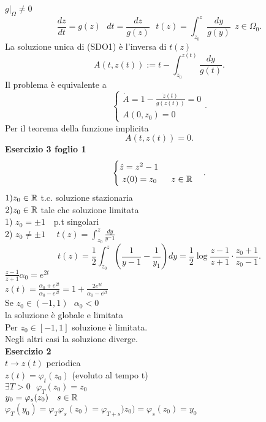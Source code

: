 \documentclass[12px]{article}
\begin{document}
  $g|_\Omega\neq 0$\\
   \[
	   \frac{dz}{dt} = g(z) \ \ \ dt= \frac {dz}{g(z)} \ \ \ t(z) = \int_{z_0}^z \frac{dy}{g(y)} \ \ z\in\Omega_0
  .\] 
  La soluzione unica di (SDO1) è l'inversa di $t(z)$\\
   \[
	   A(t,z(t)) := t - \int_{z_0}^{z(t)}\frac{dy}{g(t)}
  .\] 
  Il problema è equivalente a 
   \[
  \begin{cases}
	  \dot A = 1 - \frac{\dot z(t)}{g(z(t))} =0 \\
	  A(0,z_0) = 0
  \end{cases}
  .\] 
  Per il teorema della funzione implicita\\
  \[
  A(t,z(t)) = 0
  .\] 
  \textbf{Esercizio 3 foglio 1}\\
  \[
  \begin{cases}
  	\dot z = z^2 - 1\\\
	z(0) = z_0 \ \ \ \ \ z\in\mathbb{R}
  \end{cases}
  .\] 
  $1) z_0\in\mathbb{R}$ t.c. soluzione stazionaria\\
  $2) z_0\in \mathbb{R} $ tale che soluzione limitata
	\hline \ \\
	1) $z_0 = \pm 1\ \  \ $ p.t singolari\\
	2) $z_0 \neq \pm 1$ \ \ $t(z) = \int_{z_0}^z \frac {dy}{y^-1}$\\
	\[
		t(z) = \frac 12 \int_{z_0}^z \left(\frac{1}{y-1} - \frac{1}{y_1} \right) dy = \frac 12 \log\frac{z-1}{z+1}\cdot\frac{z_0 + 1}{z_0 - 1}
	.\] 
	$\frac{z-1}{z+1}\alpha_0 = e^{2t}$\\
	$z(t) = \frac{\alpha_0 + e^{2t}}{\alpha_0 - e^{2t}} = 1 + \frac{2e^{2t}}{\alpha_0 - e^{2t}}$ \\
	Se $z_0\in(-1,1) \ \ \ \alpha_0 < 0$\\
	la soluzione è globale e limitata\\
	Per $z_0\in[-1,1]$ soluzione è limitata.\\
	Negli altri casi la soluzione diverge.\\
	\textbf{Esercizio 2}\\
	$t \rightarrow z(t)$ periodica\\
	$z(t) = \varphi_t(z_0)$ (evoluto al tempo t)\\
	$\exists T > 0 \ \ \ \varphi_T(z_0) = z_0$\\
	$y_0 = \varphi_s (z_0) \ \ \ s\in\R$\\
	$ \varphi_T(y_0) = \varphi_T \varphi_s(z_0) = \varphi_{T+s})z_0) = \varphi_s(z_0) = y_0$
\end{document}
